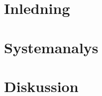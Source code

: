 \documentclass[usenames,dvipsnames]{article}
\begin{document}

\tableofcontents\thispagestyle{empty}
\clearpage

\section{Inledning}


\newpage\section{Systemanalys}


\newpage\section{Diskussion}

\end{document}
